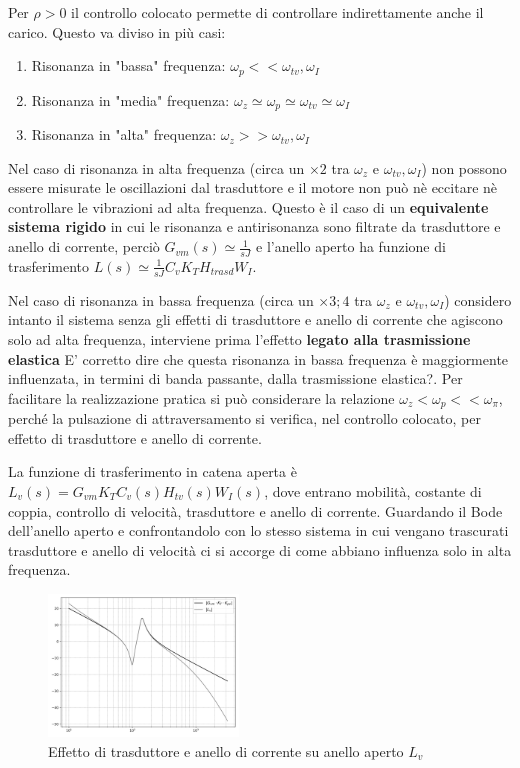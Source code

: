 Per \(\rho > 0\) il controllo colocato permette di controllare indirettamente anche il carico.
Questo va diviso in più casi:
\begin{enumerate}
    \item Risonanza in "bassa" frequenza: \(\omega_p << \omega_{tv}, \omega_I\)
    \item Risonanza in "media" frequenza: \(\omega_z \simeq \omega_p \simeq \omega_{tv} \simeq \omega_I\)
    \item Risonanza in "alta" frequenza: \(\omega_z >> \omega_{tv}, \omega_I\)
\end{enumerate} 

Nel caso di risonanza in alta frequenza (circa un \(\times 2\) tra \(\omega_z\) e \(\omega_{tv},\omega_I\)) non possono essere misurate le oscillazioni dal trasduttore e il motore non può nè eccitare nè controllare le vibrazioni ad alta frequenza. Questo è il caso di un \textbf{equivalente sistema rigido} in cui le risonanza e antirisonanza sono filtrate da trasduttore e anello di corrente, perciò \(G_{vm}(s) \simeq \frac{1}{sJ}\) e l'anello aperto ha funzione di trasferimento \(L(s) \simeq \frac{1}{sJ} C_v K_T H_{trasd} W_I\).

Nel caso di risonanza in bassa frequenza (circa un \(\times 3;4\) tra \(\omega_z\) e \(\omega_{tv}, \omega_I\)) considero intanto il sistema senza gli effetti di trasduttore e anello di corrente che agiscono solo ad alta frequenza, interviene prima l'effetto \textbf{legato alla trasmissione elastica} {\color{red}E' corretto dire che questa risonanza in bassa frequenza è maggiormente influenzata, in termini di banda passante, dalla trasmissione elastica?}.
Per facilitare la realizzazione pratica si può considerare la relazione \(\omega_z < \omega_p << \omega_\pi\), perché la pulsazione di attraversamento si verifica, nel controllo colocato, per effetto di trasduttore e anello di corrente.

La funzione di trasferimento in catena aperta è \(L_v(s) = G_{vm}K_T C_v(s) H_{tv}(s) W_I(s)\), dove entrano mobilità, costante di coppia, controllo di velocità, trasduttore e anello di corrente.
Guardando il Bode dell'anello aperto e confrontandolo con lo stesso sistema in cui vengano trascurati trasduttore e anello di velocità ci si accorge di come abbiano influenza solo in alta frequenza.

\begin{figure}[h]
    \centering
    \includegraphics[width=0.45\textwidth]{Immagini/risonanza_bassa_f_Gvm_vs_Lv.png}
    \caption{Effetto di trasduttore e anello di corrente su anello aperto \(L_v\)}
\end{figure}

